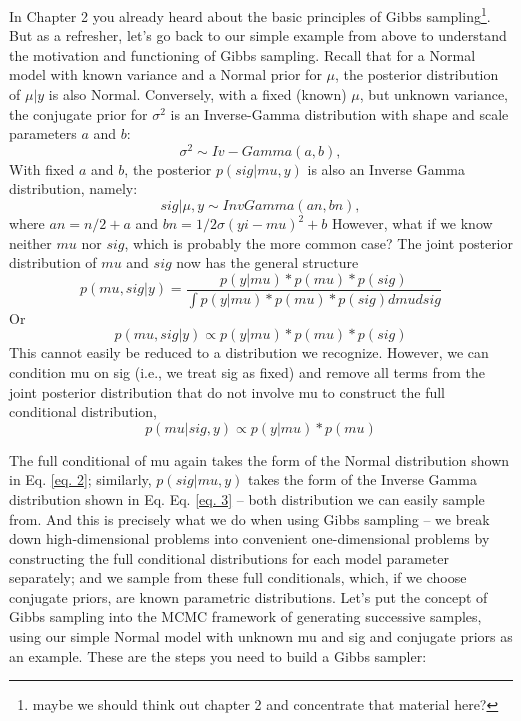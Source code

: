 In Chapter 2 you already heard about the basic principles of Gibbs
sampling\footnote{maybe we should think out chapter 2 and concentrate
  that material here?}. But as a refresher, let's go back to our
simple example from above to understand the motivation and functioning
of Gibbs sampling. Recall that for a Normal model with known variance
and a Normal prior for $\mu$, the posterior distribution of $\mu|y$ is also
Normal. Conversely, with a fixed (known) $\mu$, but unknown variance, the
conjugate prior for $\sigma^2$ is an Inverse-Gamma distribution with shape and scale parameters $a$ and $b$:
\[
\sigma^2 \sim Iv-Gamma(a,b),
\]
With fixed $a$ and $b$, the posterior $p(sig|mu,y)$ is also an Inverse Gamma distribution, namely:
\begin{equation}
sig|\mu,y \sim Inv Gamma (an, bn),
\label{eq. 3}
\end{equation}
 where  $an = n/2   + a$ and $bn = 1/2 \sigma (yi-mu)^2+ b$
However, what if we know neither $mu$ nor $sig$, which is probably the
more common case? The joint posterior distribution of $mu$ and $sig$
now has the general structure
\[
p(mu, sig|y) = \frac{p(y|mu)* p(mu) *p(sig)}{ \int p(y|mu)* p(mu) *p(sig) dmu dsig }
\]
Or
\[
p(mu, sig|y) \propto p(y|mu)* p(mu) *p(sig)
\]
This cannot easily be reduced to a distribution we recognize. However,
we can condition mu on sig (i.e., we treat sig as fixed) and remove
all terms from the joint posterior distribution that do not involve mu
to construct the full conditional distribution,
\[
p(mu|sig,y)  \propto p(y|mu)* p(mu)
\]


The full conditional of mu again takes the form of the Normal
distribution shown in Eq. \ref{eq. 2}; similarly, $p(sig|mu,y)$ takes
the form of the Inverse Gamma distribution shown in
Eq. Eq. \ref{eq. 3}  – both distribution we can easily sample
from. And this is precisely what we do when using Gibbs sampling – we
break down high-dimensional problems into convenient one-dimensional
problems by constructing the full conditional distributions for each
model parameter separately; and we sample from these full
conditionals, which, if we choose conjugate priors, are known
parametric distributions.
Let's put the concept of Gibbs sampling into the MCMC framework of
generating successive samples, using our simple Normal model with
unknown mu and sig and conjugate priors as an example. These are the
steps you need to build a Gibbs sampler:

